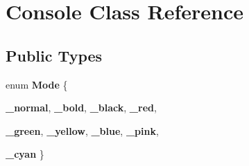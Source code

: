 \hypertarget{classConsole}{
\section{Console Class Reference}
\label{classConsole}
}
\subsection*{Public Types}
\begin{DoxyCompactItemize}
\item 
enum {\bfseries Mode} \{ \par
{\bfseries \_\-normal}, 
{\bfseries \_\-bold}, 
{\bfseries \_\-black}, 
{\bfseries \_\-red}, 
\par
{\bfseries \_\-green}, 
{\bfseries \_\-yellow}, 
{\bfseries \_\-blue}, 
{\bfseries \_\-pink}, 
\par
{\bfseries \_\-cyan}
 \}
\end{DoxyCompactItemize}
